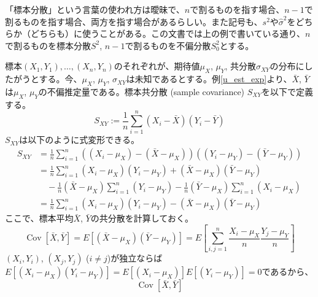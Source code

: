 \documentclass[uplatex,dvipdfmx]{jlreq}
\newcommand\term[1]{\textsf{#1}}
\begin{document}
\begin{note}
    「標本分散」という言葉の使われ方は曖昧で、$n$で割るものを指す場合、$n-1$で割るものを指す場合、両方を指す場合があるらしい。また記号も、$s^2$や$\hat{\sigma}^2$をどちらか（どちらも）に使うことがある。この文書では上の例で書いている通り、$n$で割るものを標本分散$S^2$, $n-1$で割るものを不偏分散$S_0^2$とする。
\end{note}

\begin{example}[期待値が未知の場合の共分散の不偏推定量]
    標本$(X_1, Y_1), \dotsc, (X_n, Y_n)$のそれぞれが、期待値$\mu_X$, $\mu_Y$, 共分散$\sigma_{XY}$の分布にしたがうとする。今、$\mu_X$, $\mu_Y$, $\sigma_{XY}$は未知であるとする。例\ref{u_est_exp}より、$\bar{X}$, $\bar{Y}$は$\mu_X$, $\mu_Y$の不偏推定量である。\term{標本共分散 (sample covariance)} $S_{XY}$を以下で定義する。
    \begin{equation}
        S_{XY} := \frac{1}{n} \sum_{i=1}^n (X_i - \bar{X})(Y_i - \bar{Y})
    \end{equation}
    $S_{XY}$は以下のように式変形できる。
    \begin{equation}
        \begin{split}
            S_{XY}
            &= \frac{1}{n}\sum_{i=1}^n
            \left((X_i-\mu_X)-(\bar{X}-\mu_X)\right)
            \left((Y_i-\mu_Y)-(\bar{Y}-\mu_Y)\right) \\
            &= \frac{1}{n}\sum_{i=1}^n (X_i - \mu_X)(Y_i - \mu_Y)
            + (\bar{X} - \mu_X)(\bar{Y} - \mu_Y) \\
            &\quad - \frac{1}{n}(\bar{X} - \mu_X) \sum_{i=1}^n (Y_i - \mu_Y)
            - \frac{1}{n}(\bar{Y} - \mu_X) \sum_{i=1}^n (X_i - \mu_X) \\
            &= \frac{1}{n}\sum_{i=1}^n (X_i - \mu_X)(Y_i - \mu_Y)
            - (\bar{X} - \mu_X)(\bar{Y} - \mu_Y)
        \end{split}
    \end{equation}
    ここで、標本平均$\bar{X}$, $\bar{Y}$の共分散を計算しておく。
    \begin{equation}
        \operatorname{Cov}[\bar{X}, \bar{Y}]
        = E[(\bar{X} - \mu_X)(\bar{Y} - \mu_Y)]
        = E\left[\sum_{i, j=1}^n\frac{X_i - \mu_X}{n}\frac{Y_j - \mu_Y}{n}\right]
    \end{equation}
    $(X_i, Y_i)$, $(X_j, Y_j)$ ($i \neq j$)が独立ならば$E[(X_i-\mu_X)(Y_i-\mu_Y)] = E[(X_i-\mu_X)]E[(Y_i-\mu_Y)] = 0$であるから、
    \begin{equation}
        \operatorname{Cov}[\bar{X}, \bar{Y}]

\end{equation}
\end{example}
\end{document}
